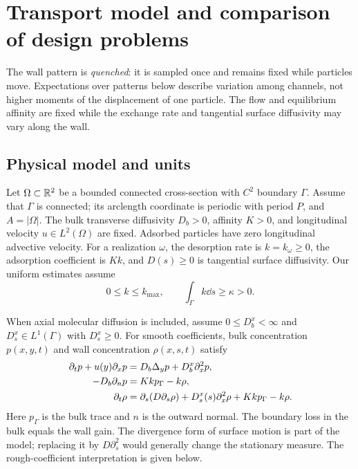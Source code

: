 \section{Transport model and comparison of design problems}
\label{sec:model}

The wall pattern is \emph{quenched}: it is sampled once and remains fixed while
particles move. Expectations over patterns below describe variation among
channels, not higher moments of the displacement of one particle. The flow
and equilibrium affinity are fixed while the exchange rate and tangential
surface diffusivity may vary along the wall.

\subsection{Physical model and units}
Let $\Omega\subset\mathbb R^2$ be a bounded connected cross-section with $C^2$
boundary $\Gamma$. Assume that $\Gamma$ is connected; its arclength coordinate
is periodic with period $P$, and $A=|\Omega|$. The bulk transverse diffusivity
$D_b>0$, affinity $K>0$, and longitudinal velocity $u\in L^2(\Omega)$ are
fixed. Adsorbed particles have zero longitudinal advective velocity. For a
realization $\omega$, the desorption rate is $k=k_\omega\ge0$, the adsorption
coefficient is $Kk$, and $D(s)\ge0$ is tangential surface diffusivity. Our
uniform estimates assume
\begin{equation}\label{eq:rate-assumptions}
 0\le k\le k_{\max},\qquad \int_\Gamma k\dd s\ge\kappa>0.
\end{equation}

When axial molecular diffusion is included, assume
$0\le D_b^x<\infty$ and $D_s^x\in L^1(\Gamma)$ with $D_s^x\ge0$.
For smooth coefficients, bulk concentration $p(x,y,t)$ and wall
concentration $\rho(x,s,t)$ satisfy
\begin{align}
 \partial_t p+u(y)\partial_xp
 &=D_b\Delta_y p+D_b^x\partial_x^2p,\notag\\
 -D_b\partial_n p&=Kkp_\Gamma-k\rho,\label{eq:physical-pde}\\
 \partial_t\rho&=\partial_s(D\partial_s\rho)
       +D_s^x(s)\partial_x^2\rho+Kkp_\Gamma-k\rho.\notag
\end{align}
Here $p_\Gamma$ is the bulk trace and $n$ is the outward normal. The boundary
loss in the bulk equals the wall gain. The divergence form of surface
motion is part of the model; replacing it by $D\partial_s^2$ would generally
change the stationary measure. The rough-coefficient interpretation is
given below.

